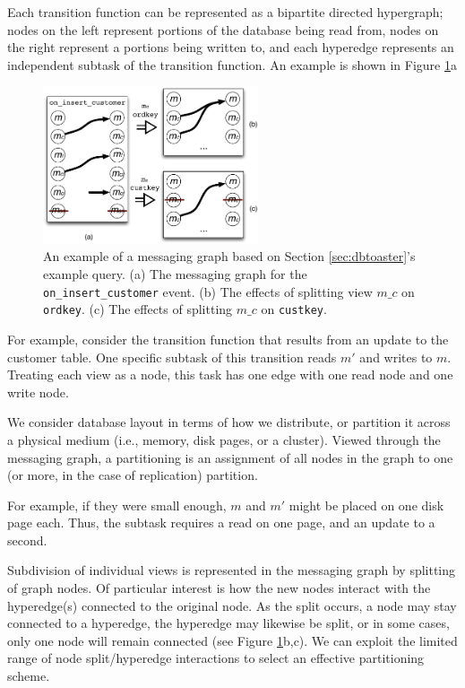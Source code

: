 Each transition function can be represented as a bipartite directed hypergraph; nodes on the left represent portions of the database being read from, nodes on the right represent a portions being written to, and each hyperedge represents an independent subtask of the transition function.  An example is shown in Figure \ref{fig:diag:messagingGraph}a

\begin{figure}
\begin{center}
\includegraphics[width=2.5in]{graphics/MessagingGraph}
\end{center}
\caption{An example of a messaging graph based on Section \ref{sec:dbtoaster}'s example query.  (a) The messaging graph for the \texttt{on\_insert\_customer} event.  (b) The effects of splitting view $m\_c$ on \texttt{ordkey}.  (c) The effects of splitting $m\_c$ on \texttt{custkey}.}
\label{fig:diag:messagingGraph}
\vspace*{-0.2in}
\end{figure}

For example, consider the transition function that results from an update to the customer table.  One specific subtask of this transition reads $m'$ and writes to $m$.  Treating each view as a node, this task has one edge with one read node and one write node.  

We consider database layout in terms of how we distribute, or partition it across a physical medium (i.e., memory, disk pages, or a cluster).  Viewed through the messaging graph, a partitioning is an assignment of all nodes in the graph to one (or more, in the case of replication) partition.  

For example, if they were small enough, $m$ and $m'$ might be placed on one disk page each.  Thus, the subtask requires a read on one page, and an update to a second.

Subdivision of individual views is represented in the messaging graph by splitting of graph nodes.  Of particular interest is how the new nodes interact with the hyperedge(s) connected to the original node.  As the split occurs, a node may stay connected to a hyperedge, the hyperedge may likewise be split, or in some cases, only one node will remain connected (see Figure \ref{fig:diag:messagingGraph}b,c).  We can exploit the limited range of node split/hyperedge interactions to select an effective partitioning scheme.

